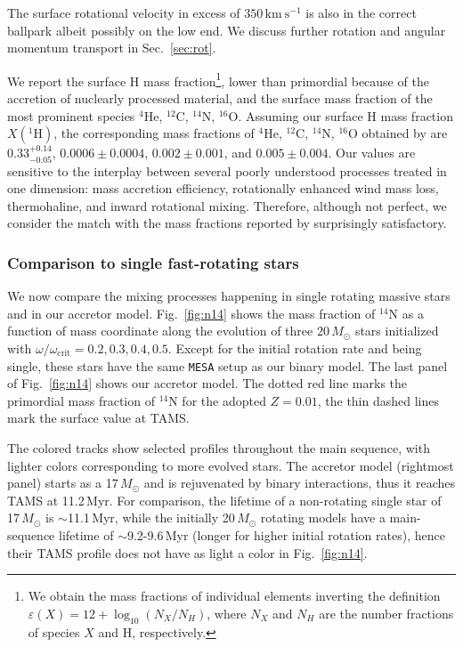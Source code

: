 \documentclass[twocolumn,twocolappendix,trackchanges]{aastex63}
\newcommand{\kms}{{\mathrm{km\ s^{-1}}}}
\DeclareRobustCommand{\Figref}[1]{Fig.~\ref{#1}}
\DeclareRobustCommand{\Secref}[1]{Sec.~\ref{#1}}
\begin{document}
The surface rotational velocity in
excess of $350\,\kms$ is also in the correct ballpark albeit possibly
on the low end. We discuss further rotation and angular momentum
transport in \Secref{sec:rot}.

We report the surface H mass
fraction\footnote{We obtain the mass fractions of individual elements
  inverting the definition $\varepsilon(X)=12+\log_{10}(N_X/N_H)$, where $N_X$ and
  $N_H$ are the number fractions of species $X$ and H, respectively.},
lower than primordial because of the accretion of nuclearly processed
material, and the surface mass fraction of the most prominent species
$^4\mathrm{He}$, $^{12}\mathrm{C}$, $^{14}\mathrm{N}$,
$^{16}\mathrm{O}$.  Assuming our surface H mass fraction
$X(^1\mathrm{H})$, the corresponding mass fractions of $^4\mathrm{He}$,
$^{12}\mathrm{C}$, $^{14}\mathrm{N}$, $^{16}\mathrm{O}$ obtained by
 are
$0.33^{+0.14}_{-0.05}$,
$0.0006\pm0.0004$,
$0.002\pm0.001$, and
$0.005\pm0.004$.  Our values are
sensitive to the interplay between several poorly understood
processes treated in one dimension: mass accretion efficiency, rotationally enhanced wind mass
loss, thermohaline, and inward rotational mixing. Therefore, although
not perfect, we consider the match with the mass fractions reported by
 surprisingly satisfactory.

\subsubsection{Comparison to single fast-rotating stars}
\label{sec:mix_comparison_single}

We now compare the mixing processes
happening in single rotating massive stars and in our accretor
model. \Figref{fig:n14} shows the mass fraction of $^{14}\mathrm{N}$
as a function of mass coordinate along the evolution of three
$20\,M_\odot$ stars initialized with
$\omega/\omega_\mathrm{crit}=0.2,0.3,0.4,0.5$. Except for the initial rotation rate and
being single, these stars have the same \texttt{MESA}
setup as our binary model. The last panel of \Figref{fig:n14} shows
our accretor model. The dotted red line marks the primordial mass
fraction of $^{14}\mathrm{N}$ for the adopted $Z=0.01$, the thin
dashed lines mark the surface value at TAMS.


The colored tracks show selected profiles throughout the main
sequence, with lighter colors corresponding to more evolved stars. The
accretor model (rightmost panel) starts as a 17$\,M_\odot$ and is
rejuvenated by binary interactions, thus it reaches TAMS at
11.2\,Myr. For comparison, the lifetime of a non-rotating single star
of 17\,$M_\odot$ is $\sim$11.1\,Myr, while the initially 20\,$M_\odot$
rotating models have a main-sequence lifetime of $\sim$9.2-9.6\,Myr (longer
for higher initial rotation rates), hence their TAMS profile does not
have as light a color in \Figref{fig:n14}.
\end{document}

